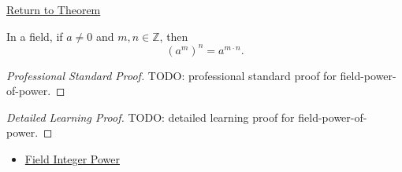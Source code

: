 \newpage
{}
\label{prf:field-power-of-power}

\begin{remark*}[Return]
\hyperref[thm:field-power-of-power]{Return to Theorem}
\end{remark*}

\begin{theorem*}
In a field, if $a\ne0$ and $m,n\in\mathbb{Z}$, then
\[
(a^m)^n=a^{m\cdot n}.
\]
\end{theorem*}

\begin{proof}[Professional Standard Proof]
\LRAProofBodyStart
TODO: professional standard proof for field-power-of-power.
\end{proof}

\begin{proof}[Detailed Learning Proof]
\LRAProofBodyStart
TODO: detailed learning proof for field-power-of-power.
\end{proof}

\begin{remark*}
\end{remark*}

\begin{dependencies}
\begin{itemize}
  \item \hyperref[def:two-sided-inverse]{Field Integer Power}
\end{itemize}
\end{dependencies}

\clearpage
